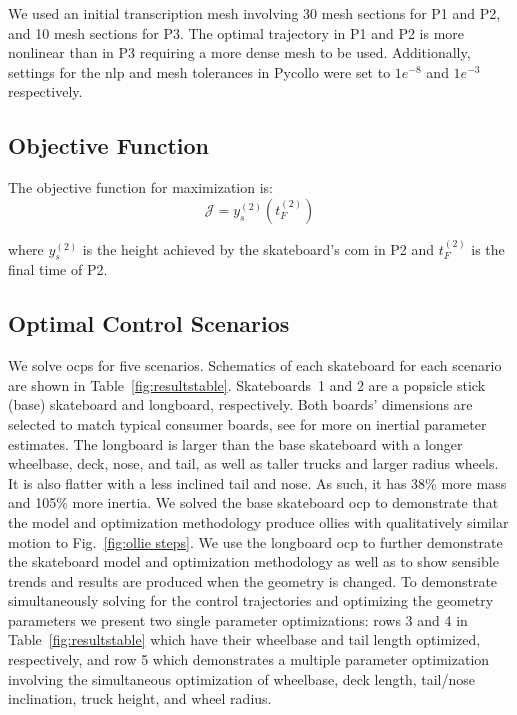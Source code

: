 \documentclass[default,iicol,pdflatex]{sn-jnl}
\begin{document}
We used an initial transcription mesh involving 30 mesh sections for P1 and P2, and 10 mesh sections for P3. The optimal trajectory in P1 and P2 is more nonlinear than in P3 requiring a more dense mesh to be used.
Additionally, settings for the \gls{nlp} and mesh tolerances in Pycollo were set to $1e^{-8}$ and $1e^{-3}$ respectively.

\subsection{Objective Function}

The objective function for maximization is:
%
\begin{equation}
  \mathcal{J} = y_s^{(2)}\left(t_F^{(2)}\right)
\end{equation}

\noindent where $y_s^{(2)}$ is the height achieved by the skateboard's \gls{com} in P2 and $t_F^{(2)}$ is the final time of P2.

\subsection{Optimal Control Scenarios}
%
We solve \glspl{ocp} for five scenarios. Schematics of each skateboard for each scenario are shown in Table~\ref{fig:resultstable}. Skateboards~1 and 2 are a popsicle stick (base) skateboard and longboard, respectively. Both boards' dimensions are selected to match typical consumer boards, see \cite{heinen_optimal_2022} for more on inertial parameter estimates. 
The longboard is larger than the base skateboard with a longer wheelbase, deck, nose, and tail, as well as taller trucks and larger radius wheels. It is also flatter with a less inclined tail and nose. As such, it has 38\% more mass and 105\% more inertia.
We solved the base skateboard \gls{ocp} to demonstrate that the model and optimization methodology produce ollies with qualitatively similar motion to Fig.~\ref{fig:ollie steps}.
We use the longboard \gls{ocp} to further demonstrate the skateboard model and optimization methodology as well as to show sensible trends and results are produced when the geometry is changed.
To demonstrate simultaneously solving for the control trajectories and optimizing the geometry parameters we present two single parameter optimizations: rows 3 and 4 in Table~\ref{fig:resultstable} which have their wheelbase and tail length optimized, respectively, and row 5 which demonstrates a multiple parameter optimization involving the simultaneous optimization of wheelbase, deck length, tail/nose inclination, truck height, and wheel radius.
\end{document}
